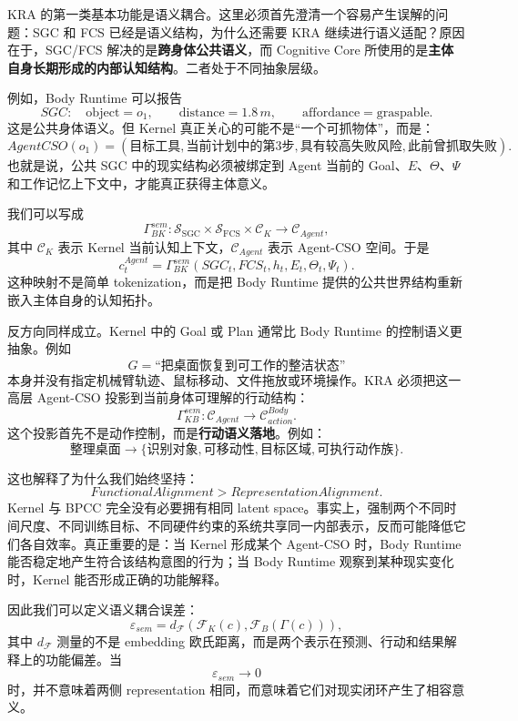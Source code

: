 KRA 的第一类基本功能是语义耦合。这里必须首先澄清一个容易产生误解的问题：SGC 和 FCS 已经是语义结构，为什么还需要 KRA 继续进行语义适配？原因在于，SGC/FCS 解决的是\textbf{跨身体公共语义}，而 Cognitive Core 所使用的是\textbf{主体自身长期形成的内部认知结构}。二者处于不同抽象层级。

例如，Body Runtime 可以报告
\[
SGC:
\quad
\mathrm{object}=o_1,\qquad
\mathrm{distance}=1.8\,m,\qquad
\mathrm{affordance}=\mathrm{graspable}.
\]
这是公共身体语义。但 Kernel 真正关心的可能不是``一个可抓物体''，而是：
\[
AgentCSO(o_1)
=
\left(
\text{目标工具},
\text{当前计划中的第3步},
\text{具有较高失败风险},
\text{此前曾抓取失败}
\right).
\]
也就是说，公共 SGC 中的现实结构必须被绑定到 Agent 当前的 Goal、$E$、$\Theta$、$\Psi$ 和工作记忆上下文中，才能真正获得主体意义。

我们可以写成
\[
\Gamma_{BK}^{sem}:
\mathcal S_{\mathrm{SGC}}
\times
\mathcal S_{\mathrm{FCS}}
\times
\mathcal C_K
\rightarrow
\mathcal C_{Agent},
\]
其中 $\mathcal C_K$ 表示 Kernel 当前认知上下文，$\mathcal C_{Agent}$ 表示 Agent-CSO 空间。于是
\[
c^{Agent}_t
=
\Gamma_{BK}^{sem}
\left(
SGC_t,
FCS_t,
h_t,
E_t,
\Theta_t,
\Psi_t
\right).
\]
这种映射不是简单 tokenization，而是把 Body Runtime 提供的公共世界结构重新嵌入主体自身的认知拓扑。

反方向同样成立。Kernel 中的 Goal 或 Plan 通常比 Body Runtime 的控制语义更抽象。例如
\[
G=
\text{``把桌面恢复到可工作的整洁状态''}
\]
本身并没有指定机械臂轨迹、鼠标移动、文件拖放或环境操作。KRA 必须把这一高层 Agent-CSO 投影到当前身体可理解的行动结构：
\[
\Gamma_{KB}^{sem}:
\mathcal C_{Agent}
\rightarrow
\mathcal C^{Body}_{action}.
\]
这个投影首先不是动作控制，而是\textbf{行动语义落地}。例如：
\[
\text{整理桌面}
\rightarrow
\{
\text{识别对象},
\text{可移动性},
\text{目标区域},
\text{可执行动作族}
\}.
\]

这也解释了为什么我们始终坚持：
\[
\boxed{
FunctionalAlignment
>
RepresentationAlignment.
}
\]
Kernel 与 BPCC 完全没有必要拥有相同 latent space。事实上，强制两个不同时间尺度、不同训练目标、不同硬件约束的系统共享同一内部表示，反而可能降低它们各自效率。真正重要的是：当 Kernel 形成某个 Agent-CSO 时，Body Runtime 能否稳定地产生符合该结构意图的行为；当 Body Runtime 观察到某种现实变化时，Kernel 能否形成正确的功能解释。

因此我们可以定义语义耦合误差：
\[
\varepsilon_{sem}
=
d_{\mathcal F}
\left(
\mathcal F_K(c),
\mathcal F_B(\Gamma(c))
\right),
\]
其中 $d_{\mathcal F}$ 测量的不是 embedding 欧氏距离，而是两个表示在预测、行动和结果解释上的功能偏差。当
\[
\varepsilon_{sem}\rightarrow 0
\]
时，并不意味着两侧 representation 相同，而意味着它们对现实闭环产生了相容意义。

